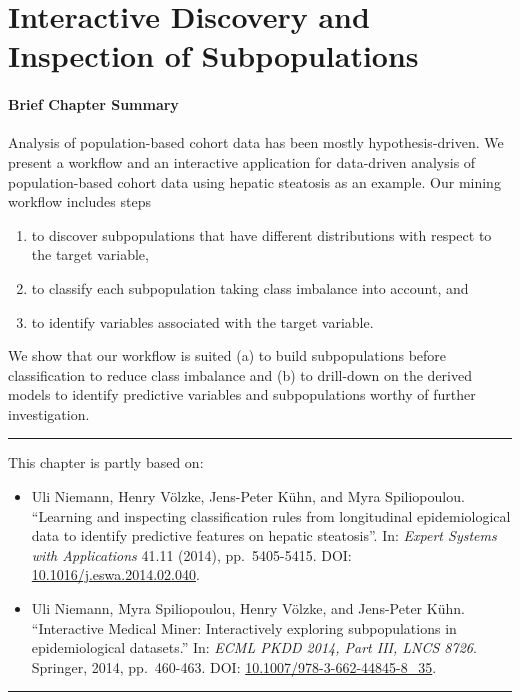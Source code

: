 \documentclass[
  oneside]{book}
\providecommand{\tightlist}{%
  \setlength{\itemsep}{0pt}\setlength{\parskip}{0pt}}
\newenvironment{infobox}[1]
  {
  \begin{chapter-summary}
  }
  {
  \end{chapter-summary}
  }
\newenvironment{lit}
  {
  \vspace{8pt}
  \hrule
  \vspace{8pt}
  }
  {
  \vspace{8pt}
  \hrule
  \vspace{8pt}
  }
\begin{document}
\hypertarget{imm}{%
\chapter{Interactive Discovery and Inspection of Subpopulations}\label{imm}}

\begin{infobox}{tasks.pdf}

\hypertarget{brief-chapter-summary}{%
\subsubsection*{Brief Chapter Summary}\label{brief-chapter-summary}}

Analysis of population-based cohort data has been mostly hypothesis-driven.
We present a workflow and an interactive application for data-driven analysis of population-based cohort data using hepatic steatosis as an example.
Our mining workflow includes steps

\begin{enumerate}
\def\labelenumi{\roman{enumi}.}
\tightlist
\item
  to discover subpopulations that have different distributions with respect to the target variable,
\item
  to classify each subpopulation taking class imbalance into account, and
\item
  to identify variables associated with the target variable.
\end{enumerate}

We show that our workflow is suited (a) to build subpopulations before classification to reduce class imbalance and (b) to drill-down on the derived models to identify predictive variables and subpopulations worthy of further investigation.

\end{infobox}

\begin{lit}

This chapter is partly based on:

\begin{itemize}
\tightlist
\item
  Uli Niemann, Henry Völzke, Jens-Peter Kühn, and Myra Spiliopoulou. ``Learning and inspecting classification rules from longitudinal epidemiological data to identify predictive features on hepatic steatosis''. In: \emph{Expert Systems with Applications} 41.11 (2014), pp.~5405-5415. DOI: \href{https://doi.org/10.1016\%2Fj.eswa.2014.02.040}{10.1016/j.eswa.2014.02.040}.
\item
  Uli Niemann, Myra Spiliopoulou, Henry Völzke, and Jens-Peter Kühn. ``Interactive Medical Miner: Interactively exploring subpopulations in epidemiological datasets.'' In: \emph{ECML PKDD 2014, Part III, LNCS 8726}. Springer, 2014, pp.~460-463.
  DOI: \href{https://doi.org/10.1007\%2F978-3-662-44845-8_35}{10.1007/978-3-662-44845-8\_35}.
\end{itemize}

\end{lit}
\end{document}
